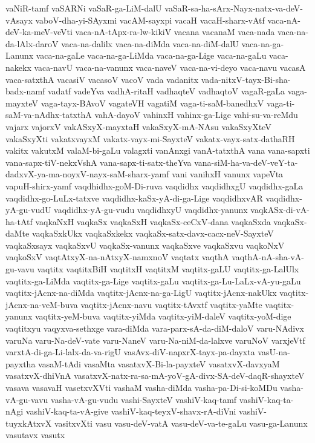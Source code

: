 {vaNiR-tamf
vaSARNi
vaSaR-ga-LiM-dalU
vaSaR-sa-ha-sArx-Nayx-natx-va-deV-vAsayx
vaboV-dha-yi-SAyxmi
vacAM-sayxpi
vacaH
vacaH-sharx-vAtf
vaca-nA-deV-ka-meV-veVti
vaca-nA-tApx-ra-lw-kikiV
vacana
vacanaM
vaca-nada
vaca-na-da-lAlx-daroV
vaca-na-dalilx
vaca-na-diMda
vaca-na-diM-dalU
vaca-na-ga-Lanunx
vaca-na-gaLe
vaca-na-ga-LiMda
vaca-na-ga-Lige
vaca-na-gaLu
vaca-nakekx
vaca-navU
vaca-na-vanunx
vaca-naveV
vaca-na-vi-deyo
vaca-navu
vacasA
vaca-satxthA
vacasiV
vacasoV
vacoV
vada
vadanitx
vada-nitxV-tayx-Bi-sha-badx-namf
vadatf
vadeYva
vadhA-ritaH
vadhaqteV
vadhaqtoV
vagaR-gaLa
vaga-mayxteV
vaga-tayx-BAvoV
vagateVH
vagatiM
vaga-ti-saM-banedhxV
vaga-ti-saM-va-nAdhx-tatxthA
vahA-dayoV
vahinxH
vahinx-ga-Lige
vahi-su-va-reMdu
vajarx
vajorxV
vakASxyX-mayxtaH
vakaSxyX-mA-NAsu
vakaSxyXteV
vakaSxyXti
vakatxvayxM
vakatx-vayx-mi-SayxteV
vakatx-vayx-satx-dathaRH
vakitx
vakutxM
valaM-bi-gaLu
valagxti
vanAnxgi
vanA-tatxthA
vana
vana-sapxti
vana-sapx-tiV-nekxVshA
vana-sapx-ti-satx-theYva
vana-siM-ha-va-deV-veY-ta-dadxvX-ya-ma-noyxV-nayx-saM-sharx-yamf
vani
vanihxH
vanunx
vapeVta
vapuH-shirx-yamf
vaqdhidhx-goM-Di-ruva
vaqdidhx
vaqdidhxgU
vaqdidhx-gaLa
vaqdidhx-go-LuLx-tatxve
vaqdidhx-kaSx-yA-di-ga-Lige
vaqdidhxvAR
vaqdidhx-yA-gu-vudU
vaqdidhx-yA-gu-vudu
vaqdidhxyU
vaqdidhx-yanunx
vaqkASx-di-vA-ha-tAtf
vaqkaNxH
vaqkaSx
vaqkaSxH
vaqkaSx-ceCxV-dana
vaqkaSxda
vaqkaSx-daMte
vaqkaSxkUkx
vaqkaSxkekx
vaqkaSx-satx-davx-cacx-neV-SayxteV
vaqkaSxsayx
vaqkaSxvU
vaqkaSx-vanunx
vaqkaSxve
vaqkaSxvu
vaqkoNxV
vaqkoSxV
vaqtAtxyX-na-nAtxyX-namxnoV
vaqtatx
vaqthA
vaqthA-nA-sha-vA-gu-vavu
vaqtitx
vaqtitxBiH
vaqtitxH
vaqtitxM
vaqtitx-gaLU
vaqtitx-ga-LalUlx
vaqtitx-ga-LiMda
vaqtitx-ga-Lige
vaqtitx-gaLu
vaqtitx-ga-Lu-LaLx-vA-yu-gaLu
vaqtitx-jAcnx-na-diMda
vaqtitx-jAcnx-na-ga-LigU
vaqtitx-jAcnx-nakUkx
vaqtitx-jAcnx-na-veM-buva
vaqtitx-jAcnx-navu
vaqtitx-tAvxtf
vaqtitx-yaMte
vaqtitx-yanunx
vaqtitx-yeM-buva
vaqtitx-yiMda
vaqtitx-yiM-daleV
vaqtitx-yoM-dige
vaqtitxyu
vaqyxva-sethxge
vara-diMda
vara-parx-sA-da-diM-daloV
varu-NAdivx
varuNa
varu-Na-deV-vate
varu-NaneV
varu-Na-niM-da-lalxve
varuNoV
varxjeVtf
varxtA-di-ga-Li-lalx-da-va-rigU
vasAvx-diV-napxrX-tayx-pa-dayxta
vasU-na-payxtha
vasaM-tAdi
vasaMta
vasatxvX-Bi-la-payxteV
vasatxvX-davxyaM
vasatxvX-dhiVnA
vasatxvX-natx-ra-sa-mA-yoV-gA-divx-SA-deV-daqR-shayxteV
vasava
vasavaH
vasetxvXVti
vashaM
vasha-diMda
vasha-pa-Di-si-koMDu
vasha-vA-gu-vavu
vasha-vA-gu-vudu
vashi-SayxteV
vashiV-kaq-tamf
vashiV-kaq-ta-nAgi
vashiV-kaq-ta-vA-give
vashiV-kaq-teyxV-shavx-rA-diVni
vashiV-tuyxkAtxvX
vasitxvXti
vasu
vasu-deV-vatA
vasu-deV-va-te-gaLu
vasu-ga-Lanunx
vasutavx
vasutx
}
